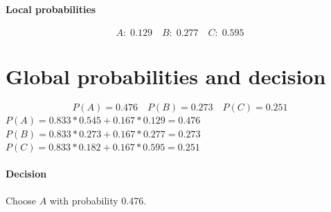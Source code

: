 \documentclass[11pt]{article}
\begin{document}
\paragraph{Local probabilities}
\[A:\; 0.129\quad B:\; 0.277\quad C:\; 0.595\]
\section*{Global probabilities and decision}
\[P(A) = 0.476\quad P(B) = 0.273\quad P(C) = 0.251\]
\(P(A) = 0.833*0.545 + 0.167*0.129 = 0.476\) \\ \(P(B) = 0.833*0.273 + 0.167*0.277 = 0.273\) \\ \(P(C) = 0.833*0.182 + 0.167*0.595 = 0.251\)
\paragraph{Decision} Choose \(A\) with probability 0.476.
\end{document}
